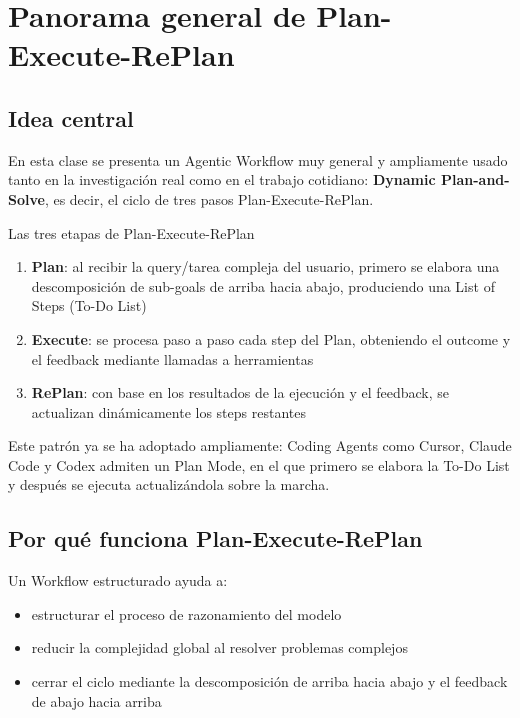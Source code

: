 \section{Panorama general de Plan-Execute-RePlan}

\subsection{Idea central}

En esta clase se presenta un Agentic Workflow muy general y ampliamente usado tanto en la investigación real como en el trabajo cotidiano: \textbf{Dynamic Plan-and-Solve}, es decir, el ciclo de tres pasos Plan-Execute-RePlan.

\begin{importantbox}{Las tres etapas de Plan-Execute-RePlan}
\begin{enumerate}
    \item \textbf{Plan}: al recibir la query/tarea compleja del usuario, primero se elabora una descomposición de sub-goals de arriba hacia abajo, produciendo una List of Steps (To-Do List)
    \item \textbf{Execute}: se procesa paso a paso cada step del Plan, obteniendo el outcome y el feedback mediante llamadas a herramientas
    \item \textbf{RePlan}: con base en los resultados de la ejecución y el feedback, se actualizan dinámicamente los steps restantes
\end{enumerate}
\end{importantbox}

Este patrón ya se ha adoptado ampliamente: Coding Agents como Cursor, Claude Code y Codex admiten un Plan Mode, en el que primero se elabora la To-Do List y después se ejecuta actualizándola sobre la marcha.

\subsection{Por qué funciona Plan-Execute-RePlan}

Un Workflow estructurado ayuda a:
\begin{itemize}
    \item estructurar el proceso de razonamiento del modelo
    \item reducir la complejidad global al resolver problemas complejos
    \item cerrar el ciclo mediante la descomposición de arriba hacia abajo y el feedback de abajo hacia arriba
\end{itemize}

